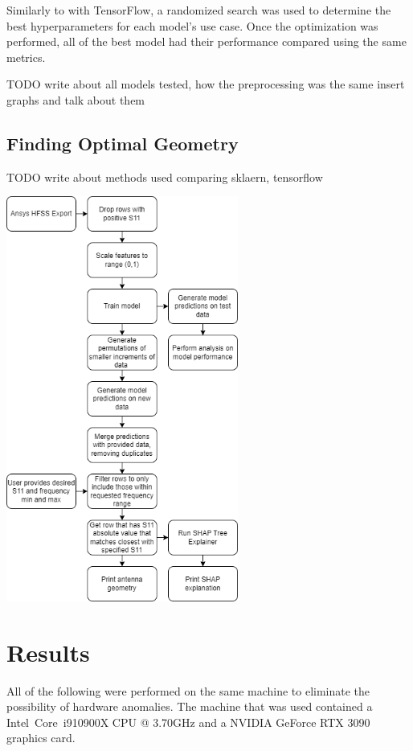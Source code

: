 \documentclass[lettersize,journal]{IEEEtran}
\newenvironment{Figure}
    {\par\medskip\noindent\minipage{\linewidth}}
    {\endminipage\par\medskip}
\begin{document}
Similarly to with TensorFlow, a randomized search was used to determine the best hyperparameters for each model's use case. Once the optimization was performed, all of the best model had their performance compared using the same metrics. 

TODO write about all models tested, how the preprocessing was the same insert graphs and talk about them 

\subsection{Finding Optimal Geometry}
TODO write about methods used comparing sklaern, tensorflow


\begin{Figure}
\centering
\includegraphics[width=3.0in]{methodology}
\label{data_flow}
\end{Figure}


\section{Results}
All of the following were performed on the same machine to eliminate the possibility of hardware anomalies. The machine that was used contained a  Intel\textregistered~Core\texttrademark~i9\-10900X CPU @ 3.70GHz and a NVIDIA GeForce RTX 3090 graphics card. 
\end{document}
